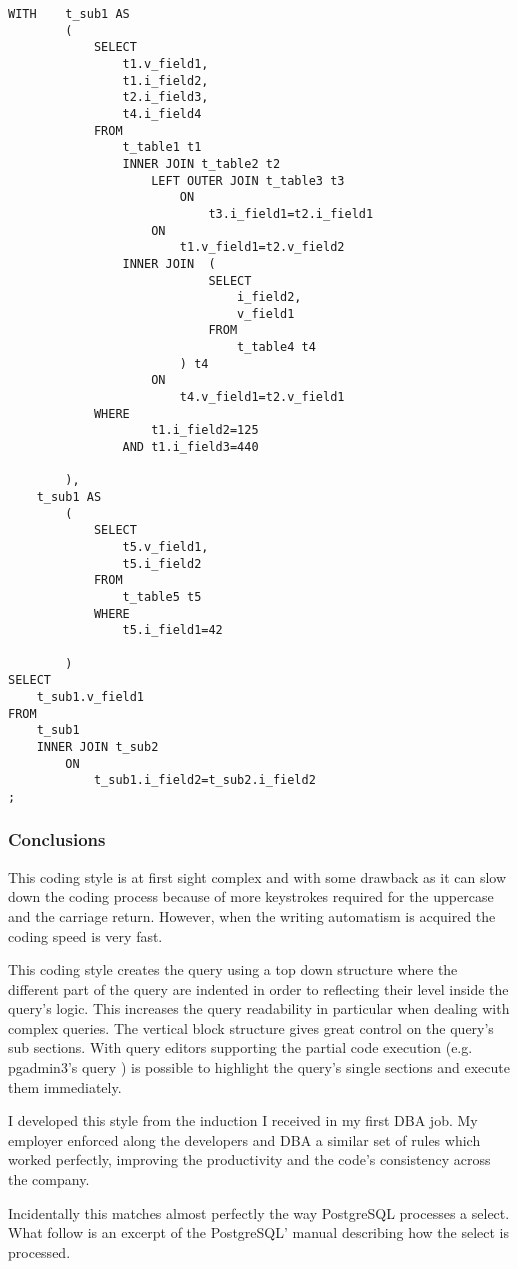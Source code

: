 \begin{lstlisting}[style=pgsql]
WITH	t_sub1 AS
		(
			SELECT 
				t1.v_field1,
				t1.i_field2,
				t2.i_field3,
				t4.i_field4
			FROM 
				t_table1 t1 
				INNER JOIN t_table2 t2
					LEFT OUTER JOIN t_table3 t3
						ON
							t3.i_field1=t2.i_field1
					ON
						t1.v_field1=t2.v_field2
				INNER JOIN 	(
							SELECT 
								i_field2,
								v_field1
							FROM
								t_table4 t4
						) t4
					ON
						t4.v_field1=t2.v_field1
			WHERE 
					t1.i_field2=125
				AND	t1.i_field3=440
		
		),
	t_sub1 AS
		(
			SELECT
				t5.v_field1,
				t5.i_field2
			FROM
				t_table5 t5
			WHERE 
				t5.i_field1=42
		
		)
SELECT 
	t_sub1.v_field1
FROM
	t_sub1
	INNER JOIN t_sub2
		ON
			t_sub1.i_field2=t_sub2.i_field2
;
\end{lstlisting}



\subsubsection{Conclusions}

This coding style is at first sight complex and with some drawback as it can slow down the coding process because 
of more keystrokes required for the uppercase and the carriage return. However, when the writing automatism is acquired 
the coding speed is very fast.\newline

This coding style creates the query using a top down structure where the different part of the query are 
indented in order to reflecting their level inside the query's logic. This increases the query readability in 
particular when dealing with complex queries. The vertical block structure gives great control on the query's sub 
sections. With query editors supporting the partial code execution  (e.g. pgadmin3's query ) is possible to highlight 
the query's single sections and execute them immediately. 

I developed this style from the induction I received in my first DBA job. My employer enforced along the developers and 
DBA a similar set of rules which worked perfectly, improving the productivity and the code's consistency across the 
company.\newline

Incidentally this matches almost perfectly the way PostgreSQL processes a select. What follow is an excerpt of the 
PostgreSQL' manual describing how the select is processed.

